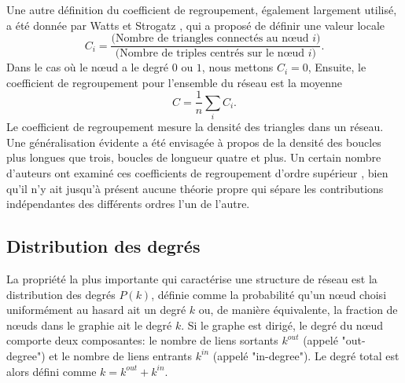 Une autre définition du coefficient de regroupement, également largement utilisé, a été donnée par Watts et Strogatz \cite{WS1998},
qui a proposé de définir une valeur locale
 \begin{equation}
    C_i=\frac{\text{(Nombre de triangles connectés au nœud $i$)}}{\text{(Nombre de triples centrés sur le nœud $i$)}}.
  \end{equation}
  Dans le cas où le nœud a le degré $0$ ou $1$, nous mettons $C_i=0$, Ensuite, le coefficient de regroupement pour l'ensemble
  du réseau est la moyenne
  \begin{equation}
    C=\frac{1}{n}\sum_i C_i.
  \end{equation}
 Le coefficient de regroupement mesure la densité des triangles dans un réseau. Une généralisation évidente a été envisagée à 
propos de la densité des boucles plus longues que trois, boucles de longueur quatre et plus. Un certain nombre d'auteurs ont 
examiné ces coefficients de regroupement d'ordre supérieur \cite{Ne2003,BC2003,Fron-al2002,Gle-al2001}, bien qu'il n'y ait jusqu'à présent
aucune théorie propre qui sépare les contributions indépendantes des différents ordres l'un de l'autre.
   \subsection{Distribution des degrés}
   La propriété la plus importante qui caractérise une structure de réseau est la distribution des degrés $P(k)$,
   définie comme la probabilité qu'un nœud choisi uniformément au hasard ait un degré $k$ ou, de manière équivalente, la
   fraction de nœuds dans le graphie ait le degré $k$.
   Si le graphe est dirigé, le degré du nœud comporte deux composantes: le nombre de liens sortants $k^{out}$ (appelé
   "out-degree") et le nombre de liens entrants $k^{in}$ (appelé "in-degree"). Le degré total est alors défini comme 
   $k=k^{out}+k^{in}$.\\

